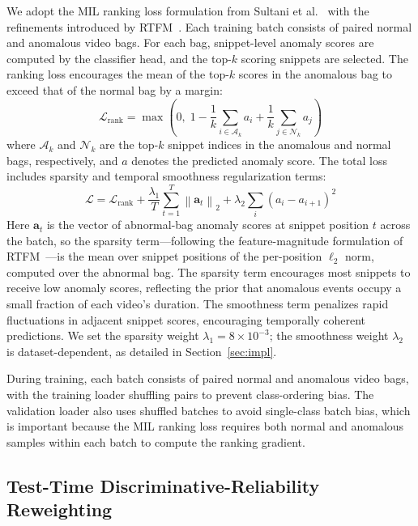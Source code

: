 \documentclass[sigconf]{acmart}
\begin{document}
We adopt the MIL ranking loss formulation from Sultani et al.~\cite{sultani2018ucfcrime} with the refinements introduced by RTFM~\cite{tian2021rtfm}. Each training batch consists of paired normal and anomalous video bags. For each bag, snippet-level anomaly scores are computed by the classifier head, and the top-$k$ scoring snippets are selected. The ranking loss encourages the mean of the top-$k$ scores in the anomalous bag to exceed that of the normal bag by a margin:
\begin{equation}
    \mathcal{L}_{\text{rank}} = \max\left(0,\; 1 - \frac{1}{k}\sum_{i \in \mathcal{A}_k} a_i + \frac{1}{k}\sum_{j \in \mathcal{N}_k} a_j\right)
\end{equation}
where $\mathcal{A}_k$ and $\mathcal{N}_k$ are the top-$k$ snippet indices in the anomalous and normal bags, respectively, and $a$ denotes the predicted anomaly score. The total loss includes sparsity and temporal smoothness regularization terms:
\begin{equation}
    \mathcal{L} = \mathcal{L}_{\text{rank}} + \frac{\lambda_1}{T}\sum_{t=1}^{T} \left\| \mathbf{a}_t \right\|_2 + \lambda_2 \sum_i (a_i - a_{i+1})^2
    \label{eq:loss}
\end{equation}
Here $\mathbf{a}_t$ is the vector of abnormal-bag anomaly scores at snippet position $t$ across the batch, so the sparsity term---following the feature-magnitude formulation of RTFM~\cite{tian2021rtfm}---is the mean over snippet positions of the per-position $\ell_2$ norm, computed over the abnormal bag. The sparsity term encourages most snippets to receive low anomaly scores, reflecting the prior that anomalous events occupy a small fraction of each video's duration. The smoothness term penalizes rapid fluctuations in adjacent snippet scores, encouraging temporally coherent predictions. We set the sparsity weight $\lambda_1 = 8 \times 10^{-3}$; the smoothness weight $\lambda_2$ is dataset-dependent, as detailed in Section~\ref{sec:impl}.

During training, each batch consists of paired normal and anomalous video bags, with the training loader shuffling pairs to prevent class-ordering bias. The validation loader also uses shuffled batches to avoid single-class batch bias, which is important because the MIL ranking loss requires both normal and anomalous samples within each batch to compute the ranking gradient.

\subsection{Test-Time Discriminative-Reliability Reweighting}
\label{sec:disc}
\end{document}
